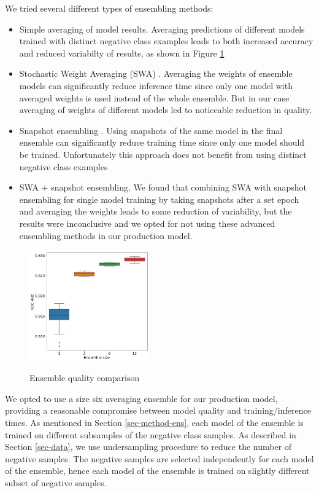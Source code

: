 \documentclass[sigconf]{acmart}
\begin{document}
We tried several different types of ensembling methods:
\begin{itemize}
\item Simple averaging of model results. Averaging predictions of different models trained with distinct negative class examples leads to both increased accuracy and reduced variabilty of results, as shown in Figure \ref{fig-ens}
\item Stochastic Weight Averaging (SWA) \cite{DBLP:journals/corr/LoshchilovH16a}.  Averaging the weights of ensemble models can significantly reduce inference time since only one model with averaged weights is used instead of the whole ensemble. But in our case averaging of weights of different models led to noticeable reduction in quality.
\item Snapshot ensembling \cite{DBLP:journals/corr/HuangLPLHW17}. Using snapshots of the same model in the final ensemble can significantly reduce training time since only one model should be trained. Unfortunately this approach does not benefit from using distinct negative class examples
\item SWA + snapshot ensembling. We found that combining SWA with snapshot ensembling for single model training by taking snapshots after a set epoch and averaging the weights leads to some reduction of variability, but the results were inconclusive and we opted for not using these advanced ensembling methods in our production model.
\end{itemize}

\begin{figure}[ht]
  \caption{Ensemble quality comparison}
  \includegraphics[width=0.46\textwidth]{figures/ensemble-pic.png}
  \label{fig-ens}
\end{figure}

We opted to use a size six averaging ensemble for our production model, providing a reasonable compromise between model quality and training/inference times. As mentioned in Section \ref{sec-method-ens}, each model of the ensemble is trained on different subsamples of the negative class samples. As described in Section \ref{sec-data}, we use undersampling procedure to reduce the number of negative samples. The negative samples are selected independently for each model of the ensemble, hence each model of the ensemble is trained on slightly different subset of negative samples.
\end{document}
